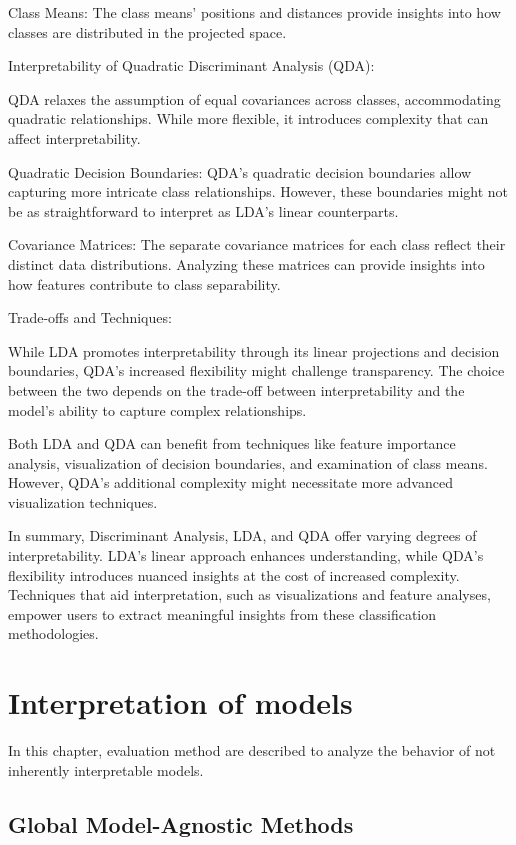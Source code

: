 Class Means: The class means' positions and distances provide insights into how classes are distributed in the projected space.

Interpretability of Quadratic Discriminant Analysis (QDA):

QDA relaxes the assumption of equal covariances across classes, accommodating quadratic relationships. While more flexible, it introduces complexity that can affect interpretability.

Quadratic Decision Boundaries: QDA's quadratic decision boundaries allow capturing more intricate class relationships. However, these boundaries might not be as straightforward to interpret as LDA's linear counterparts.

Covariance Matrices: The separate covariance matrices for each class reflect their distinct data distributions. Analyzing these matrices can provide insights into how features contribute to class separability.

Trade-offs and Techniques:

While LDA promotes interpretability through its linear projections and decision boundaries, QDA's increased flexibility might challenge transparency. The choice between the two depends on the trade-off between interpretability and the model's ability to capture complex relationships.

Both LDA and QDA can benefit from techniques like feature importance analysis, visualization of decision boundaries, and examination of class means. However, QDA's additional complexity might necessitate more advanced visualization techniques.

In summary, Discriminant Analysis, LDA, and QDA offer varying degrees of interpretability. LDA's linear approach enhances understanding, while QDA's flexibility introduces nuanced insights at the cost of increased complexity. Techniques that aid interpretation, such as visualizations and feature analyses, empower users to extract meaningful insights from these classification methodologies.


\chapter{Interpretation of models}

In this chapter, evaluation method are described to analyze the behavior of not inherently interpretable models.

\section{Global Model-Agnostic Methods}

